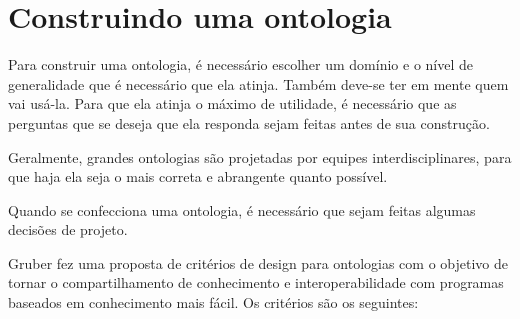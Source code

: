 \section{Construindo uma ontologia}

Para construir uma ontologia, é necessário escolher um domínio e o nível de generalidade que é necessário que ela atinja. Também deve-se ter em mente quem vai usá-la. Para que ela atinja o máximo de utilidade, é necessário que as perguntas que se deseja que ela responda sejam feitas antes de sua construção.

Geralmente, grandes ontologias são projetadas por equipes interdisciplinares, para que haja ela seja o mais correta e abrangente quanto possível. 

Quando se confecciona uma ontologia, é necessário que sejam feitas algumas decisões de projeto.  

Gruber \cite{ontoGruber} fez uma proposta de critérios de design para ontologias com o objetivo de tornar o compartilhamento de conhecimento e interoperabilidade com programas baseados em conhecimento mais fácil. Os critérios são os seguintes:

